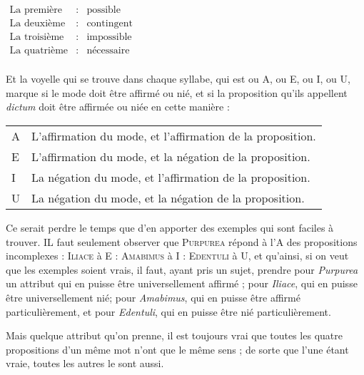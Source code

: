 \begin{center}
    $\begin{array}{lcl}
	    \text {La première} & \text{:} & \text{possible} \\
	    \text {La deuxième} & \text{:} & \text{contingent} \\
	    \text {La troisième} & \text{:} & \text{impossible} \\
	    \text {La quatrième} & \text{:} & \text{nécessaire} \\
    \end{array}$
\end{center}

Et la voyelle qui se trouve dans chaque syllabe, qui est ou A, ou E, ou I, ou U, marque si le mode doit être affirmé ou nié, et si la proposition qu'ils appellent \emph{dictum} doit être affirmée ou niée en cette manière :


\begin{table}[!htbp]\vspace{-0.4cm}
	\centering\begin{tabularx}{\textwidth}{lX}
	    A & L'affirmation du mode, et l'affirmation de la proposition. \\
	    E & L'affirmation du mode, et la négation de la proposition. \\
	    I & La négation du mode, et l'affirmation de la proposition. \\
	    U & La négation du mode, et la négation de la proposition. \\
    \end{tabularx}
\end{table}

Ce serait perdre le temps que d'en apporter des exemples qui sont faciles à trouver. IL faut seulement observer que {\scshape Purpurea} répond à l'A des propositions incomplexes : {\scshape Iliace} à E : {\scshape Amabimus} à I : {\scshape Edentuli} à U, et qu'ainsi, si on veut que les exemples soient vrais, il faut, ayant pris un sujet, prendre pour \emph{Purpurea} un attribut qui en puisse être universellement affirmé ; pour \emph{Iliace}, qui en puisse être universellement nié; pour \emph{Amabimus}, qui en puisse être affirmé particulièrement, et pour \emph{Edentuli}, qui en puisse être nié particulièrement.

Mais quelque attribut qu'on prenne, il est toujours vrai que toutes les quatre propositions d'un même mot n'ont que le même sens ; de sorte que l'une étant vraie, toutes les autres le sont aussi.
